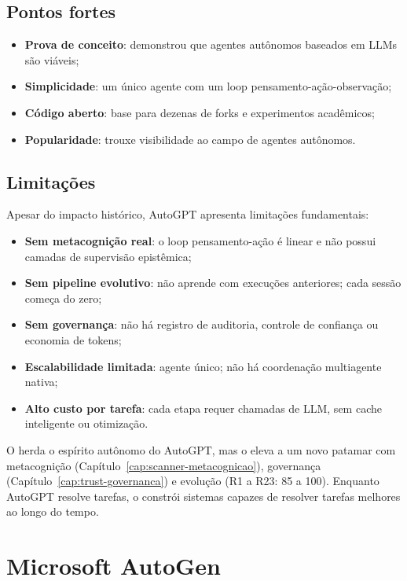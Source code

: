 \subsection{Pontos fortes}
\begin{itemize}
\item \textbf{Prova de conceito}: demonstrou que agentes autônomos
baseados em LLMs são viáveis;
\item \textbf{Simplicidade}: um único agente com um loop
pensamento-ação-observação;
\item \textbf{Código aberto}: base para dezenas de forks e
experimentos acadêmicos;
\item \textbf{Popularidade}: trouxe visibilidade ao campo de agentes
autônomos.
\end{itemize}
\subsection{Limitações}
Apesar do impacto histórico, AutoGPT apresenta limitações fundamentais:
\begin{itemize}
\item \textbf{Sem metacognição real}: o loop pensamento-ação é linear e
não possui camadas de supervisão epistêmica;
\item \textbf{Sem pipeline evolutivo}: não aprende com execuções
anteriores; cada sessão começa do zero;
\item \textbf{Sem governança}: não há registro de auditoria, controle
de confiança ou economia de tokens;
\item \textbf{Escalabilidade limitada}: agente único; não há
coordenação multiagente nativa;
\item \textbf{Alto custo por tarefa}: cada etapa requer chamadas de
LLM, sem cache inteligente ou otimização.
\end{itemize}
\noindent O \opencodeeco{} herda o espírito autônomo do AutoGPT, mas o
eleva a um novo patamar com metacognição (Capítulo~\ref{cap:scanner-metacognicao}),
governança (Capítulo~\ref{cap:trust-governanca}) e evolução (R1 a R23:
85 a 100). Enquanto AutoGPT resolve tarefas, o \opencodeeco{} constrói
sistemas capazes de resolver tarefas melhores ao longo do tempo.
\section{Microsoft AutoGen}
\label{sec:autogen}
\nivelintermediario
